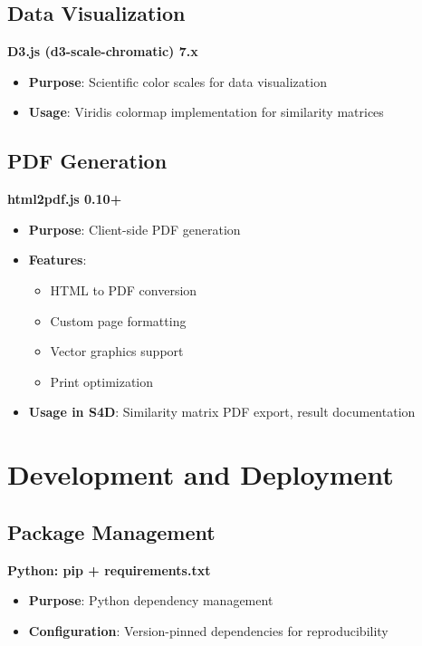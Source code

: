 \subsection{Data Visualization}
\label{subsec:d3-visualization}

\textbf{D3.js (d3-scale-chromatic) 7.x}
\begin{itemize}
    \item \textbf{Purpose}: Scientific color scales for data visualization
    \item \textbf{Usage}: Viridis colormap implementation for similarity matrices
\end{itemize}

\subsection{PDF Generation}
\label{subsec:pdf-generation}

\textbf{html2pdf.js 0.10+}
\begin{itemize}
    \item \textbf{Purpose}: Client-side PDF generation
    \item \textbf{Features}:
        \begin{itemize}
            \item HTML to PDF conversion
            \item Custom page formatting
            \item Vector graphics support
            \item Print optimization
        \end{itemize}
    \item \textbf{Usage in S4D}: Similarity matrix PDF export, result documentation
\end{itemize}

\section{Development and Deployment}
\label{sec:development-deployment}

\subsection{Package Management}
\label{subsec:package-management}

\textbf{Python: pip + requirements.txt}
\begin{itemize}
    \item \textbf{Purpose}: Python dependency management
    \item \textbf{Configuration}: Version-pinned dependencies for reproducibility
\end{itemize}

